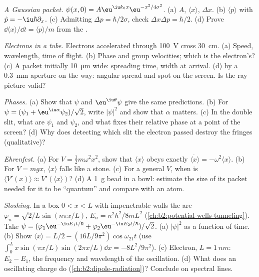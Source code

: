 \begin{exercise}[$\star\star$]\label{exo:b2:schrodinger-wave-functions:6}
\emph{A Gaussian packet.} $\psi(x,0) = A\eu^{\iu k_0x}\eu^{-x^2/4\sigma^2}$. (a)
$A$, $\langle x\rangle$, $\Delta x$. (b) $\langle p\rangle$ with $\hat p =
-\iu\hbar\partial_x$. (c) Admitting $\Delta p = \hbar/2\sigma$, check
$\Delta x\Delta p = \hbar/2$. (d) Prove $\dd\langle x\rangle/\dd t = \langle
p\rangle/m$ from the .
\end{exercise}

\begin{exercise}[$\star\star$]\label{exo:b2:schrodinger-wave-functions:7}
\emph{Electrons in a tube.} Electrons accelerated through \qty{100}{V}
cross \qty{30}{cm}. (a) Speed, wavelength, time of flight. (b) Phase and
group velocities; which is the electron's? (c) A packet initially
\qty{10}{\micro m} wide: spreading time, width at arrival. (d) 
by a \qty{0.3}{mm} aperture on the way: angular spread and spot on the
screen. Is the ray picture valid?
\end{exercise}

\begin{exercise}[$\star\star$]\label{exo:b2:schrodinger-wave-functions:8}
\emph{Phases.} (a) Show that $\psi$ and $\eu^{\iu\theta}\psi$ give the same
predictions. (b) For $\psi = (\psi_1 + \eu^{\iu\alpha}\psi_2)/\sqrt2$, write
$|\psi|^2$ and show that $\alpha$ matters. (c) In the double slit, what
are $\psi_1$ and $\psi_2$, and what fixes their relative phase at a point
of the screen? (d) Why does detecting which slit the electron passed
destroy the fringes (qualitative)?
\end{exercise}

\begin{exercise}[$\star\star$]\label{exo:b2:schrodinger-wave-functions:9}
\emph{Ehrenfest.} (a) For $V = \tfrac12m\omega^2x^2$, show that $\langle
x\rangle$ obeys exactly $\ddot{\langle x\rangle} = -\omega^2\langle x\rangle$.
(b) For $V = mgx$, $\langle x\rangle$ falls like a stone. (c) For a general
$V$, when is $\langle V'(x)\rangle \approx V'(\langle x\rangle)$? (d) A
\qty{1}{g} bead in a bowl: estimate the size of its packet needed for
it to be ``quantum'' and compare with an atom.
\end{exercise}

\begin{exercise}[$\star\star\star$]\label{exo:b2:schrodinger-wave-functions:10}
\emph{Sloshing.} In a box $0 < x < L$ with impenetrable walls the
 are $\varphi_n = \sqrt{2/L}\sin(n\pi x/L)$, $E_n =
n^2h^2/8mL^2$ (\cref{ch:b2:potential-wells-tunneling}). Take $\psi =
(\varphi_1\eu^{-\iu E_1t/\hbar} + \varphi_2\eu^{-\iu E_2t/\hbar})/\sqrt2$. (a)
$|\psi|^2$ as a function of time. (b) Show $\langle x\rangle = L/2 -
(16L/9\pi^2)\cos\omega_{21}t$ (use $\int_0^L x\sin(\pi x/L)\sin(2\pi x/L)\dd x
= -8L^2/9\pi^2$). (c) Electron, $L = \qty{1}{nm}$: $E_2 - E_1$, the
frequency and wavelength of the oscillation. (d) What does an
oscillating charge do (\cref{ch:b2:dipole-radiation})? Conclude on
spectral lines.
\end{exercise}

